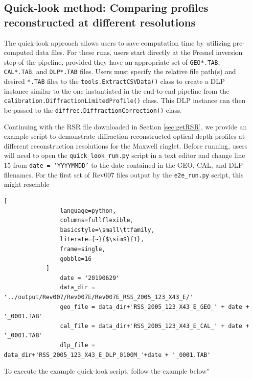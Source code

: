 \documentclass[titlepage, 12pt]{article}
\begin{document}
        \subsection{Quick-look method: Comparing profiles
                    reconstructed at different resolutions}
            \label{sec:quicklook}
            The quick-look approach allows users to save computation
            time by utilizing pre-computed data files. For these runs, users
            start directly at the Fresnel inversion step of the pipeline,
            provided they have an appropriate set of \texttt{GEO*.TAB},
            \texttt{CAL*.TAB}, and \texttt{DLP*.TAB} files. Users must
            specify the relative file path(s) and desired \texttt{*.TAB}
            files to the \texttt{tools.ExtractCSVData()} class to create
            a DLP instance similar to the one instantiated in the end-to-end
            pipeline from the \texttt{calibration.DiffractionLimitedProfile()}
            class. This DLP instance can then be passed to the
            \texttt{diffrec.DiffractionCorrection()} class.
            \par\hfill\par
            Continuing with the RSR file downloaded in Section
            \ref{sec:getRSR}, we provide an example script to demonstrate
            diffraction-reconstructed optical depth profiles at different
            reconstruction resolutions for the Maxwell ringlet. Before
            running, users will need to open the \texttt{quick\_look\_run.py} script in a text editor
            and change line 15 from \texttt{date = 'YYYYMMDD'} to the date contained in the GEO, CAL, and DLP filenames. 
            For the first set of Rev007 files output by the
            \texttt{e2e\_run.py} script, this might resemble
            \begin{lstlisting}[
                language=python,
                columns=fullflexible,
                basicstyle=\small\ttfamily,
                literate={~}{$\sim$}{1},
                frame=single,
                gobble=16
            ]
                date = '20190629'
                data_dir = '../output/Rev007/Rev007E/Rev007E_RSS_2005_123_X43_E/'
                geo_file = data_dir+'RSS_2005_123_X43_E_GEO_' + date + '_0001.TAB'
                cal_file = data_dir+'RSS_2005_123_X43_E_CAL_' + date + '_0001.TAB'
                dlp_file = data_dir+'RSS_2005_123_X43_E_DLP_0100M_'+date + '_0001.TAB'
            \end{lstlisting}
            To execute the example quick-look script, follow the example below"
\end{document}
